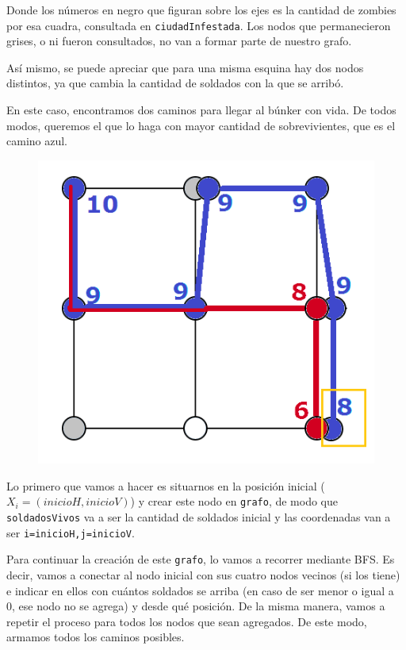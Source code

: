 Donde los n\'umeros en negro que figuran sobre los ejes es la cantidad de zombies por esa cuadra, consultada en \texttt{ciudadInfestada}. 
Los nodos que permanecieron grises, o ni fueron consultados, no van a formar parte de nuestro grafo.

As\'i mismo, se puede apreciar que para una misma esquina hay dos nodos distintos, ya que cambia la cantidad de soldados con la que se arrib\'o.\\

\newpage

En este caso, encontramos dos caminos para llegar al b\'unker con vida. De todos modos, queremos el que lo haga con mayor cantidad de sobrevivientes, que es el camino azul.

   \begin{figure}[h!]
   \begin{center}
 	\includegraphics[scale=0.7]{imagenes/ej2/final.png}
   \end{center}
 \end{figure}

\bigskip

Lo primero que vamos a hacer es situarnos en la posici\'on inicial ($X_i = (inicioH, inicioV)$) y crear este nodo en \texttt{grafo}, de modo que \texttt{soldadosVivos} va a ser la cantidad de soldados inicial y las coordenadas van a ser \texttt{i=inicioH,j=inicioV}. 

Para continuar la creaci\'on de este \texttt{grafo}, lo vamos a recorrer mediante BFS. Es decir, vamos a conectar al nodo inicial con sus cuatro nodos vecinos (si los tiene) e indicar en ellos con cu\'antos soldados se arriba (en caso de ser menor o igual a 0, ese nodo no se agrega) y desde qu\'e posici\'on. De la misma manera, vamos a repetir el proceso para todos los nodos que sean agregados. De este modo, armamos todos los caminos posibles.

